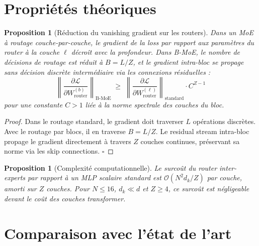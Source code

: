 \documentclass[10pt,a4paper]{article}
\newtheorem{proposition}[theorem]{Proposition}
\begin{document}
\section{Propriétés théoriques}

\begin{proposition}[Réduction du vanishing gradient sur les routers]
Dans un MoE à routage couche-par-couche, le gradient de la loss par rapport aux paramètres du router à la couche $\ell$ décroît avec la profondeur. Dans B-MoE, le nombre de décisions de routage est réduit à $B = L/Z$, et le gradient intra-bloc se propage sans décision discrète intermédiaire via les connexions résiduelles :
\begin{equation}
  \left\|\frac{\partial \mathcal{L}}{\partial W_{\mathrm{router}}^{(b)}}\right\|_{\mathrm{B\text{-}MoE}} \;\geq\; \left\|\frac{\partial \mathcal{L}}{\partial W_{\mathrm{router}}^{(\ell)}}\right\|_{\mathrm{standard}} \cdot C^{Z-1}
\end{equation}
pour une constante $C > 1$ liée à la norme spectrale des couches du bloc.
\end{proposition}

\begin{proof}
Dans le routage standard, le gradient doit traverser $L$ opérations discrètes. Avec le routage par blocs, il en traverse $B = L/Z$. Le residual stream intra-bloc propage le gradient directement à travers $Z$ couches continues, préservant sa norme via les skip connections. $\square$
\end{proof}

\begin{proposition}[Complexité computationnelle]
Le surcoût du router inter-experts par rapport à un MLP scalaire standard est $\mathcal{O}(N^2 d_k / Z)$ par couche, amorti sur $Z$ couches. Pour $N \leq 16$, $d_k \ll d$ et $Z \geq 4$, ce surcoût est négligeable devant le coût des couches transformer.
\end{proposition}

\section{Comparaison avec l'état de l'art}
\end{document}
